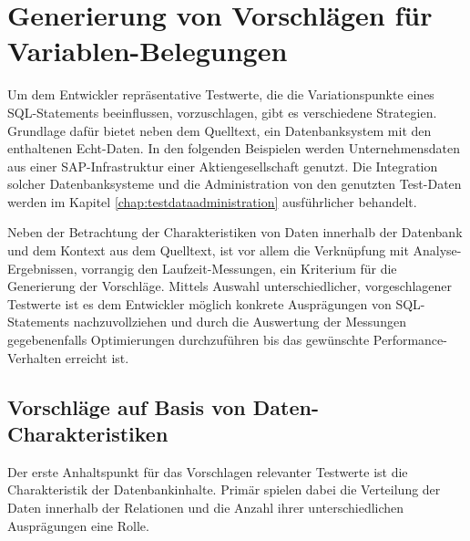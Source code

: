 \section{Generierung von Vorschlägen für Variablen-Belegungen}\label{chap:testdatasuggestions}

%
%


Um dem Entwickler repräsentative Testwerte, die die Variationspunkte eines SQL-Statements beeinflussen, vorzuschlagen, gibt es verschiedene Strategien.
Grundlage dafür bietet neben dem Quelltext, ein Datenbanksystem mit den enthaltenen Echt-Daten.
In den folgenden Beispielen werden Unternehmensdaten aus einer SAP-Infrastruktur einer Aktiengesellschaft genutzt.
Die Integration solcher Datenbanksysteme und die Administration von den genutzten Test-Daten werden im Kapitel \ref{chap:testdataadministration} ausführlicher behandelt.

Neben der Betrachtung der Charakteristiken von Daten innerhalb der Datenbank und dem Kontext aus dem Quelltext, ist vor allem die Verknüpfung mit Analyse-Ergebnissen, vorrangig den Laufzeit-Messungen, ein Kriterium für die Generierung der Vorschläge.
Mittels Auswahl unterschiedlicher, vorgeschlagener Testwerte ist es dem Entwickler möglich konkrete Ausprägungen von SQL-Statements nachzuvollziehen und durch die Auswertung der Messungen gegebenenfalls Optimierungen durchzuführen bis das gewünschte Performance-Verhalten erreicht ist.


\subsection{Vorschläge auf Basis von Daten-Charakteristiken}\label{chap:datacharacteristics}

Der erste Anhaltspunkt für das Vorschlagen relevanter Testwerte ist die Charakteristik der Datenbankinhalte.
Primär spielen dabei die Verteilung der Daten innerhalb der Relationen und die Anzahl ihrer unterschiedlichen Ausprägungen eine Rolle.


